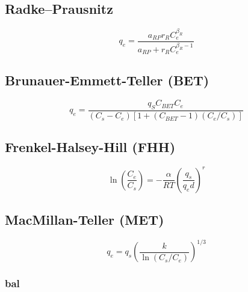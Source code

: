 \documentclass[3p]{elsarticle}
\begin{document}
\subsection{Radke–Prausnitz}
\begin{equation}
q_e = \frac{a_{RP}r_RC_e^{\beta_R}}{a_{RP}+r_RC_e^{\beta_R-1}}
\end{equation}

\subsection{Brunauer-Emmett-Teller (BET)}
\begin{equation}
q_e =
\frac{q_SC_{BET}C_e}{\left(C_s-C_e\right)\left[1+\left(C_{BET}-1\right)\left(C_e/C_s\right)\right]}
\end{equation}
\cite{Brunauer1938}

\subsection{Frenkel-Halsey-Hill (FHH)}
\begin{equation}
\ln\left(\frac{C_e}{C_s}\right) =
-\frac{\alpha}{RT}\left(\frac{q_s}{q_ed}\right)^r
\end{equation}
\cite{Hill1952}

\subsection{MacMillan-Teller (MET)}
\begin{equation}
q_e = q_s\left(\frac{k}{\ln\left(C_s/C_e\right)}\right)^{1/3}
\end{equation}
\cite{McMillan1951}



\subsubsection{bal}


\end{document}
